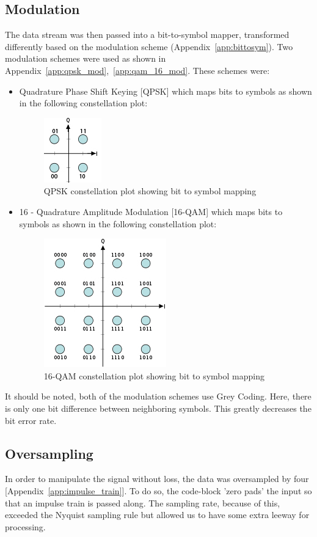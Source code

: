 \documentclass[]{article}
\begin{document}
\subsection{Modulation}
\label{sec:modulation}
The data stream was then passed into a bit-to-symbol mapper, transformed differently based on the modulation scheme  (Appendix~\ref{app:bittosym}).  Two modulation schemes were used as shown in Appendix~\ref{app:qpsk_mod},~\ref{app:qam_16_mod}.  These schemes were:
\begin{itemize}
\item Quadrature Phase Shift Keying [QPSK] which maps bits to symbols  as shown in the following constellation plot:

	\begin{figure}[H]
	\centering
	\includegraphics[width=.2\textwidth]{QPSK.jpg}
	\caption{QPSK constellation plot showing bit to 		symbol mapping}
	\end{figure}

\item 16 - Quadrature Amplitude Modulation [16-QAM] which maps bits to symbols as shown in the following constellation plot:

	\begin{figure}[H]
	\centering
	\includegraphics[width=.3\textwidth]	{16QAM.jpg}
	\caption{16-QAM constellation plot showing bit to 	symbol mapping}
	\end{figure}

\end{itemize}

It should be noted, both of the modulation schemes use Grey Coding.  Here, there is only one bit difference between neighboring symbols. This greatly decreases the bit error rate.

\subsection{Oversampling}
\label{sec:oversample}
In order to manipulate the signal without loss, the data was oversampled by four [Appendix~\ref{app:impulse_train}].  To do so, the code-block 'zero pads' the input so that an impulse train is passed along.  The sampling rate, because of this, exceeded the Nyquist sampling rule but allowed us to have some extra leeway for processing.   
\end{document}

